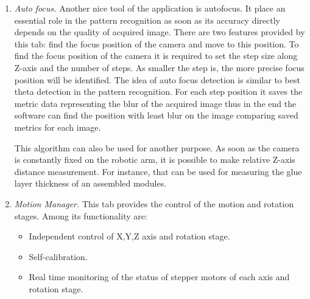 \begin{enumerate}
\item \emph{Auto focus.} Another nice tool of the application is autofocus. It place an essential role in the pattern recognition as soon as its accuracy directly depends on the quality of acquired image. There are two features provided by this tab: find the focus position of the camera and move to this position. To find the focus position of the camera it is required to set the step size along Z-axis and the number of steps. As smaller the step is, the more precise focus position will be identified. The idea of auto focus detection is similar to best theta detection in the pattern recognition. For each step position it saves the metric data representing the blur of the acquired image thus in the end the software can find the position with least blur on the image comparing saved metrics for each image.

This algorithm can also be used for another purpose. As soon as the camera is constantly fixed on the robotic arm, it is possible to make relative Z-axis distance measurement. For instance, that can be used for measuring the glue layer thickness of an assembled modules.

\item \emph{Motion Manager.}
This tab provides the control of the motion and rotation stages. Among its functionality are:

\begin{itemize}
\setlength\itemsep{-0.5em}
\item Independent control of X,Y,Z axis and rotation stage.
\item Self-calibration.
\item Real time monitoring of the status of stepper motors of each axis and rotation stage.
\end{itemize}
\end{enumerate}


